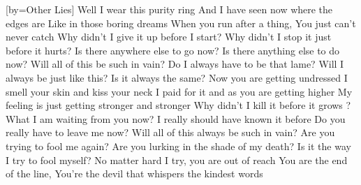 [by={Other Lies}]
  \beginverse
  Well I wear this purity ring
  And I have seen now where the edges are
  Like in those boring dreams
  When you run after a thing,
  You just can't never catch
  Why didn't I give it up before I start?
  Why didn't I stop it just before it hurts?
  Is there anywhere else to go now?
  Is there anything else to do now?
  \endverse
  \beginchorus
  Will all of this be such in vain?
  Do I always have to be that lame?
  Will I always be just like this?
  Is it always the same?
  \endchorus
  \beginverse
  Now you are getting undressed
  I smell your skin and kiss your neck
  I paid for it and as you are getting higher
  My feeling is just getting stronger and stronger
  Why didn't I kill it before it grows ?
  What I am waiting from you now?
  I really should have known it before
  Do you really have to leave me now?
  \endverse
  \beginchorus
  Will all of this always be such in vain?
  Are you trying to fool me again?
  Are you lurking in the shade of my death?
  Is it the way I try to fool myself?
  \endchorus
  \beginverse  
  No matter hard I try,
  you are out of reach
  You are the end of the line,
  You're the devil that whispers the kindest words  
  \endverse
\endsong

